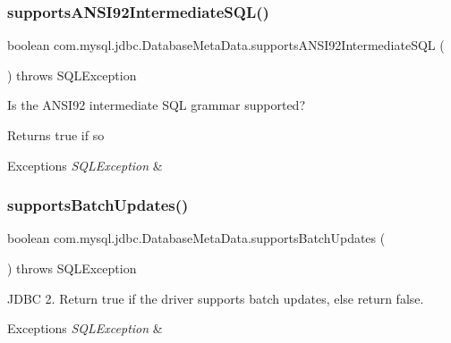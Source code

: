 \subsubsection{\texorpdfstring{supports\+A\+N\+S\+I92\+Intermediate\+S\+Q\+L()}{supportsANSI92IntermediateSQL()}}
{\footnotesize\ttfamily boolean com.\+mysql.\+jdbc.\+Database\+Meta\+Data.\+supports\+A\+N\+S\+I92\+Intermediate\+S\+QL (\begin{DoxyParamCaption}{ }\end{DoxyParamCaption}) throws S\+Q\+L\+Exception}

Is the A\+N\+S\+I92 intermediate S\+QL grammar supported?

\begin{DoxyReturn}{Returns}
true if so 
\end{DoxyReturn}

\begin{DoxyExceptions}{Exceptions}
{\em S\+Q\+L\+Exception} & \\
\hline
\end{DoxyExceptions}
\mbox{\label{classcom_1_1mysql_1_1jdbc_1_1_database_meta_data_ac121242da8caaab84663979b36e80ad0}} 
\subsubsection{\texorpdfstring{supports\+Batch\+Updates()}{supportsBatchUpdates()}}
{\footnotesize\ttfamily boolean com.\+mysql.\+jdbc.\+Database\+Meta\+Data.\+supports\+Batch\+Updates (\begin{DoxyParamCaption}{ }\end{DoxyParamCaption}) throws S\+Q\+L\+Exception}

J\+D\+BC 2. Return true if the driver supports batch updates, else return false.


\begin{DoxyExceptions}{Exceptions}
{\em S\+Q\+L\+Exception} & \\
\hline
\end{DoxyExceptions}
\mbox{\label{classcom_1_1mysql_1_1jdbc_1_1_database_meta_data_ab0f33acafccde86fefbc639b0a8a50ae}} 
